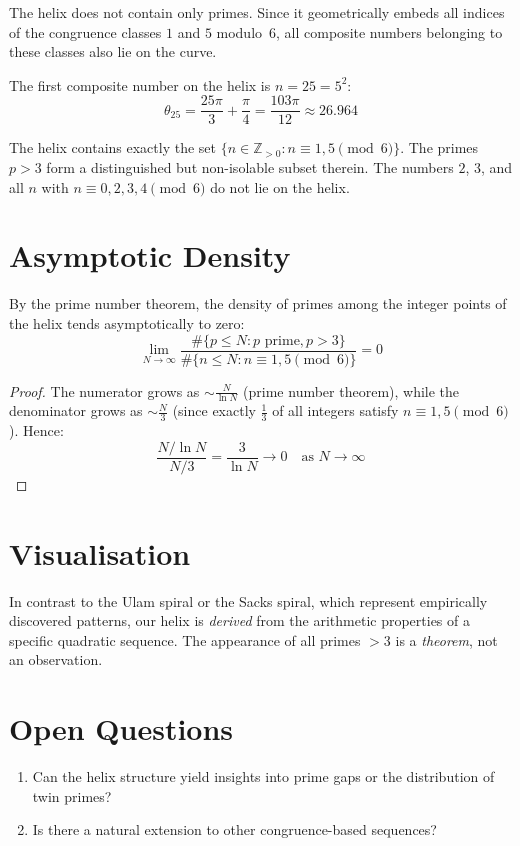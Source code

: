 The helix does not contain only primes. Since it geometrically embeds all
indices of the congruence classes $1$ and $5$ modulo~$6$, all composite
numbers belonging to these classes also lie on the curve.

\begin{example}\label{ex:first-composite}
The first composite number on the helix is $n = 25 = 5^2$:
\[
\theta_{25} = \frac{25\pi}{3} + \frac{\pi}{4} = \frac{103\pi}{12} \approx 26.964
\]
\end{example}

\begin{remark}\label{rem:complete-characterisation}
The helix contains exactly the set
$\{n \in \mathbb{Z}_{>0} : n \equiv 1, 5 \pmod{6}\}$. The primes $p > 3$
form a distinguished but non-isolable subset therein. The numbers $2$, $3$,
and all $n$ with $n \equiv 0, 2, 3, 4 \pmod{6}$ do not lie on the helix.
\end{remark}

\section{Asymptotic Density}

\begin{proposition}\label{prop:prime-density}
By the prime number theorem, the density of primes among the integer
points of the helix tends asymptotically to zero:
\[
\lim_{N \to \infty} \frac{\#\{p \leq N : p \text{ prime}, p > 3\}}{\#\{n \leq N : n \equiv 1, 5 \pmod{6}\}} = 0
\]
\end{proposition}

\begin{proof}
The numerator grows as $\sim \frac{N}{\ln N}$ (prime number theorem),
while the denominator grows as $\sim \frac{N}{3}$ (since exactly
$\frac{1}{3}$ of all integers satisfy $n \equiv 1, 5 \pmod{6}$). Hence:
\[
\frac{N/\ln N}{N/3} = \frac{3}{\ln N} \to 0 \quad\text{as } N \to \infty
\]
\end{proof}

\section{Visualisation}

\begin{remark}\label{rem:comparison-prime-spirals}
In contrast to the Ulam spiral or the Sacks spiral, which represent
empirically discovered patterns, our helix is \emph{derived} from the
arithmetic properties of a specific quadratic sequence. The appearance
of all primes $> 3$ is a \emph{theorem}, not an observation.
\end{remark}

\section{Open Questions}

\begin{enumerate}
\item Can the helix structure yield insights into prime gaps or the
  distribution of twin primes?
\item Is there a natural extension to other congruence-based sequences?
\end{enumerate}
